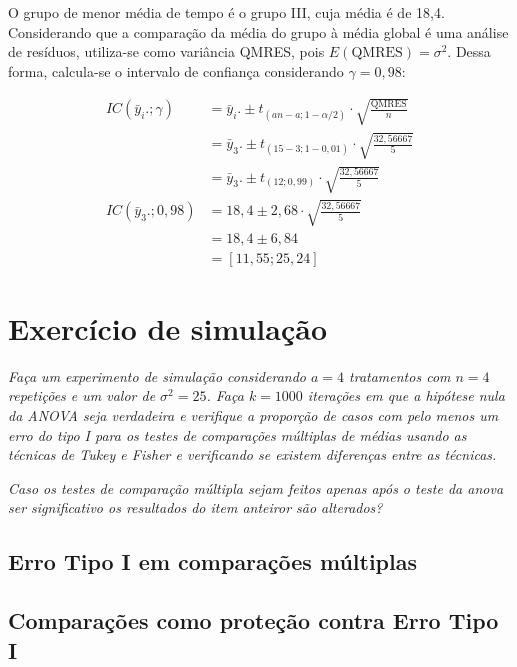 \documentclass[
]{article}
\begin{document}
O grupo de menor média de tempo é o grupo III, cuja média é de 18,4.
Considerando que a comparação da média do grupo à média global é uma
análise de resíduos, utiliza-se como variância QMRES, pois
\(E\left(\text{QMRES}\right) = \sigma^2\). Dessa forma, calcula-se o
intervalo de confiança considerando \(\gamma = 0,98\):

\begin{align}
  IC\left( \bar{y}_i.; \gamma \right) &= \bar{y}_i. \pm t_{(an-a; 1-\alpha/2)} \cdot \sqrt{\frac{\text{QMRES}}{n}}\\
  &= \bar{y}_3. \pm t_{(15-3; 1-0,01)} \cdot \sqrt{\frac{32,56667}{5}}\\
  &= \bar{y}_3. \pm t_{(12; 0,99)} \cdot \sqrt{\frac{32,56667}{5}}\\
 IC\left( \bar{y}_3.; 0,98 \right) &= 18,4 \pm 2,68 \cdot \sqrt{\frac{32,56667}{5}}\\
  &= 18,4 \pm 6,84\\
  &= \left[ 11,55 ; 25,24 \right]
\end{align}

\hypertarget{exercuxedcio-de-simulauxe7uxe3o}{%
\section{Exercício de simulação}\label{exercuxedcio-de-simulauxe7uxe3o}}

\emph{Faça um experimento de simulação considerando \(a = 4\)
tratamentos com \(n = 4\) repetições e um valor de \(\sigma^2 = 25\).
Faça \(k = 1000\) iterações em que a hipótese nula da ANOVA seja
verdadeira e verifique a proporção de casos com pelo menos um erro do
tipo I para os testes de comparações múltiplas de médias usando as
técnicas de Tukey e Fisher e verificando se existem diferenças entre as
técnicas.}

\emph{Caso os testes de comparação múltipla sejam feitos apenas após o
teste da anova ser significativo os resultados do item anteiror são
alterados?}

\hypertarget{erro-tipo-i-em-comparauxe7uxf5es-muxfaltiplas}{%
\subsection{Erro Tipo I em comparações
múltiplas}\label{erro-tipo-i-em-comparauxe7uxf5es-muxfaltiplas}}

\hypertarget{comparauxe7uxf5es-como-proteuxe7uxe3o-contra-erro-tipo-i}{%
\subsection{Comparações como proteção contra Erro Tipo
I}\label{comparauxe7uxf5es-como-proteuxe7uxe3o-contra-erro-tipo-i}}
\end{document}
